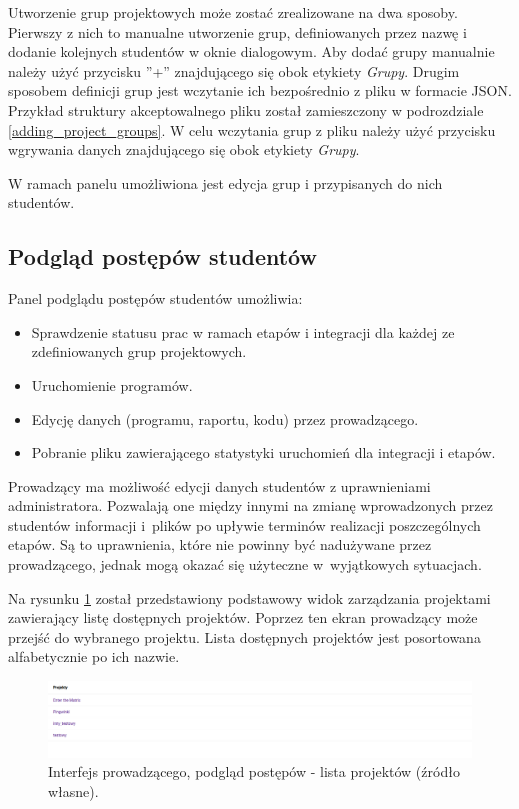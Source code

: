Utworzenie grup projektowych może zostać zrealizowane na dwa sposoby.
Pierwszy z nich to manualne utworzenie grup, definiowanych przez nazwę i dodanie kolejnych studentów w oknie dialogowym.
Aby dodać grupy manualnie należy użyć przycisku ”+” znajdującego się obok etykiety \textit{Grupy}.
Drugim sposobem definicji grup jest wczytanie ich bezpośrednio z pliku w formacie JSON.
Przykład struktury akceptowalnego pliku został zamieszczony w podrozdziale \ref{adding_project_groups}.
W celu wczytania grup z pliku należy użyć przycisku wgrywania danych znajdującego się obok etykiety \textit{Grupy}.

W ramach panelu umożliwiona jest edycja grup i przypisanych do nich studentów.

\subsection{Podgląd postępów studentów}
\label{lecturer_preview}

Panel podglądu postępów studentów umożliwia:
\begin {itemize}
    \item Sprawdzenie statusu prac w ramach etapów i integracji dla każdej ze zdefiniowanych grup projektowych.
    \item Uruchomienie programów.
    \item Edycję danych (programu, raportu, kodu) przez prowadzącego.
    \item Pobranie pliku zawierającego statystyki uruchomień dla integracji i etapów.
\end {itemize}

Prowadzący ma możliwość edycji danych studentów z uprawnieniami administratora.
Pozwalają one między innymi na zmianę wprowadzonych przez studentów informacji i~plików po upływie terminów realizacji poszczególnych etapów.
Są to uprawnienia, które nie powinny być nadużywane przez prowadzącego, jednak mogą okazać się użyteczne w~wyjątkowych sytuacjach.

Na rysunku \ref{fig:lecturer_preview_projects_list} został przedstawiony podstawowy widok zarządzania projektami zawierający listę dostępnych projektów.
Poprzez ten ekran prowadzący może przejść do wybranego projektu.
Lista dostępnych projektów jest posortowana alfabetycznie po ich nazwie.

\begin{figure}[h]
    \centering
    \includegraphics[width = 13cm]{chapter04/lecturer_preview_projects_list.png}
    \caption{Interfejs prowadzącego, podgląd postępów - lista projektów (źródło własne).}
    \label{fig:lecturer_preview_projects_list}
\end{figure}

